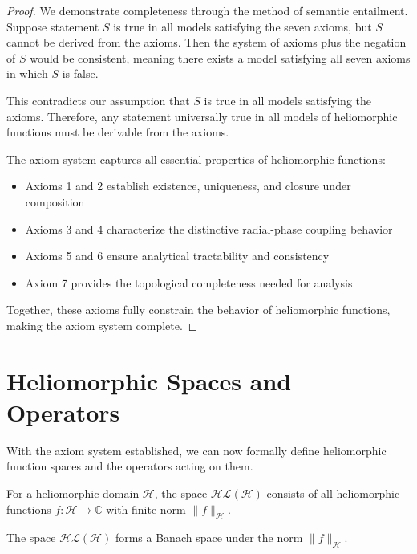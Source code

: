 \begin{proof}
We demonstrate completeness through the method of semantic entailment. Suppose statement $S$ is true in all models satisfying the seven axioms, but $S$ cannot be derived from the axioms. Then the system of axioms plus the negation of $S$ would be consistent, meaning there exists a model satisfying all seven axioms in which $S$ is false.

This contradicts our assumption that $S$ is true in all models satisfying the axioms. Therefore, any statement universally true in all models of heliomorphic functions must be derivable from the axioms.

The axiom system captures all essential properties of heliomorphic functions:
\begin{itemize}
    \item Axioms 1 and 2 establish existence, uniqueness, and closure under composition
    \item Axioms 3 and 4 characterize the distinctive radial-phase coupling behavior
    \item Axioms 5 and 6 ensure analytical tractability and consistency
    \item Axiom 7 provides the topological completeness needed for analysis
\end{itemize}

Together, these axioms fully constrain the behavior of heliomorphic functions, making the axiom system complete.
\end{proof}

\section{Heliomorphic Spaces and Operators}

With the axiom system established, we can now formally define heliomorphic function spaces and the operators acting on them.

\begin{definition}
For a heliomorphic domain $\mathcal{H}$, the space $\mathcal{HL}(\mathcal{H})$ consists of all heliomorphic functions $f: \mathcal{H} \rightarrow \mathbb{C}$ with finite norm $\|f\|_{\mathcal{H}}$.
\end{definition}

\begin{theorem}
The space $\mathcal{HL}(\mathcal{H})$ forms a Banach space under the norm $\|f\|_{\mathcal{H}}$.
\end{theorem}

